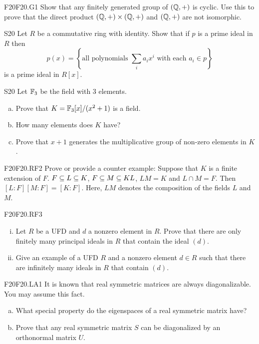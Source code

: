 \documentclass[../AlgebraQualSolutions.tex]{subfiles}
\begin{document}
\begin{prob}{F20}{F20.G1}
Show that any finitely generated group of $(\mathbb{Q},+)$ is cyclic. Use this to prove that the direct product $(\mathbb{Q},+) \times (\mathbb{Q},+)$ and $(\mathbb{Q},+)$ are not isomorphic.
\end{prob}

\begin{prob}{S20}{}
Let $R$ be a commutative ring with identity. Show that if $p$ is a prime ideal in $R$ then
	\[p(x) = \left\{\textrm{all polynomials } \sum_i a_ix^i \textrm{ with each } a_i \in p \right\} \]
is a prime ideal in $R[x]$.
\end{prob}

\begin{prob}{S20}{}
Let $\mathbb{F}_3$ be the field with 3 elements.
\begin{enumerate}[(a)]
\item Prove that $K = \mathbb{F}_3[x]/(x^2 + 1)$ is a field.
\item How many elements does $K$ have?
\item Prove that $x+1$ generates the multiplicative group of non-zero elements in $K$.
\end{enumerate}
\end{prob}

\begin{prob}{F20}{F20.RF2}
Prove or provide a counter example: Suppose that $K$ is a finite extension of $F$. $F \subseteq L \subseteq K$, $F \subseteq M \subseteq KL$, $LM = K$ and $L \cap M = F$. Then $[L:F][M:F] = [K:F]$. Here, $LM$ denotes the composition of the fields $L$ and $M$.
\end{prob}

\begin{prob}{F20}{F20.RF3}
	\begin{enumerate}[(i)]
	\item Let $R$ be a UFD and $d$ a nonzero element in $R$. Prove that there are only finitely many principal ideals  in $R$ that contain the ideal $(d)$.
	\item Give an example of a UFD $R$ and a nonzero element $d \in R$ such that there are infinitely many ideals in $R$ that contain $(d)$.
	\end{enumerate}
\end{prob}

\begin{prob}{F20}{F20.LA1}
It is known that real symmetric matrices are always diagonalizable. You may assume this fact.
\begin{enumerate}[(a)]
\item What special property do the eigenspaces of a real symmetric matrix have?
\item Prove that any real symmetric matrix $S$ can be diagonalized by an orthonormal matrix $U$.
\end{enumerate}
\end{prob}
\end{document}
